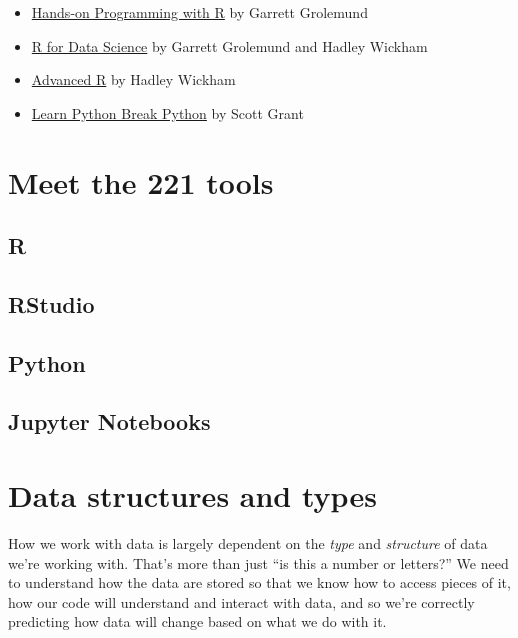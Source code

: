 \documentclass[
]{book}
\begin{document}
\begin{itemize}
\item
  \href{https://rstudio-education.github.io/hopr/}{Hands-on Programming with R} by Garrett Grolemund
\item
  \href{https://r4ds.had.co.nz/}{R for Data Science} by Garrett Grolemund and Hadley Wickham
\item
  \href{https://adv-r.hadley.nz/}{Advanced R} by Hadley Wickham
\item
  \href{https://learnpythonbreakpython.com/}{Learn Python Break Python} by Scott Grant
\end{itemize}

\hypertarget{r-py}{%
\chapter{Meet the 221 tools}\label{r-py}}

\hypertarget{r}{%
\section{R}\label{r}}

\hypertarget{rstudio}{%
\section{RStudio}\label{rstudio}}

\hypertarget{python}{%
\section{Python}\label{python}}

\hypertarget{jupyter-notebooks}{%
\section{Jupyter Notebooks}\label{jupyter-notebooks}}

\hypertarget{types}{%
\chapter{Data structures and types}\label{types}}

How we work with data is largely dependent on the \emph{type} and \emph{structure} of data we're working with. That's more than just ``is this a number or letters?'' We need to understand how the data are stored so that we know how to access pieces of it, how our code will understand and interact with data, and so we're correctly predicting how data will change based on what we do with it.
\end{document}
